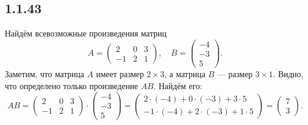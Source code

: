 \subsection{1.1.43}

Найдём всевозможные произведения матриц
\[
A=
\begin{pmatrix}
	2 & 0 & 3 \\
	-1 & 2 & 1
\end{pmatrix}
,\quad B=
\begin{pmatrix}
	-4 \\
	-3 \\
	5
\end{pmatrix}
.
\]
Заметим, что матрица $A$ имеет размер $2\times 3$, а матрица $B$ --- размер $3\times 1$. Видно, что определено только произведение $AB$. Найдём его:
\[
AB=
\begin{pmatrix}
	2 & 0 & 3 \\
	-1 & 2 & 1
\end{pmatrix}
\cdot
\begin{pmatrix}
	-4 \\
	-3 \\
	5
\end{pmatrix}
=
\begin{pmatrix}
	2\cdot(-4)+0\cdot(-3)+3\cdot5 \\
	-1\cdot(-4)+2\cdot(-3)+1\cdot5
\end{pmatrix}
=
\begin{pmatrix}
	7 \\
	3
\end{pmatrix}
.
\]